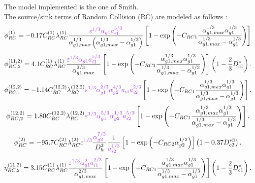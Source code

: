 The model implemented is the one of Smith.\\
The source/sink terms of Random Collision (RC) are modeled as follows :
\begin{equation}
 \phi_{RC}^{(1)} = -0.17 C_{RC}^{(1)} \lambda_{RC}^{(1)} \frac{{\color{mydarkorchid} \varepsilon^{1/3} \alpha_{g1} a_{i1}^{5/3} }}{ \alpha_{g1,max}^{1/3} \left( \alpha_{g1,max}^{1/3} - \alpha_{g1}^{1/3} \right) } \left[ 1 - \exp \left( - C_{RC1} \frac{ \alpha_{g1,max}^{1/3} \alpha_{g1}^{1/3} }{ \alpha_{g1,max}^{1/3} - \alpha_{g1}^{1/3}}\right) \right]
\end{equation}
\begin{equation}
 \phi_{RC,2}^{(11,2)} = 4.1 C_{RC}^{(1)} \lambda_{RC}^{(1)} \frac{{\color{mydarkorchid} \varepsilon^{1/3} \alpha_{g1} a_{i1}^{5/3}} }{ \alpha_{g1,max}^{2/3} } \left[ 1 - \exp \left( - C_{RC1} \frac{ \alpha_{g1,max}^{1/3} \alpha_{g1}^{1/3} }{ \alpha_{g1,max}^{1/3} - \alpha_{g1}^{1/3}}\right) \right]  \left( 1 - \frac{2}{3} D_{c1}^{*} \right).
 \end{equation}
\begin{equation}
  \phi_{RC,1}^{(12,2)} = -1.14 C_{RC}^{(12,2)} \lambda_{RC}^{(12,2)} {\color{mydarkorchid}\varepsilon^{1/3} \alpha_{g1}^{2/3} \alpha_{g2}^{4/3} a_{i1} a_{i2}^{2/3} }\left[ 1 - \exp \left( - C_{RC1} \frac{ \alpha_{g1,max}^{1/3} \alpha_{g1}^{1/3} }{ \alpha_{g1,max}^{1/3} - \alpha_{g1}^{1/3}}\right) \right].
\end{equation}
\begin{equation}
\phi_{RC,2}^{(12,2)} = 1.80 C_{RC}^{(12,2)} \lambda_{RC}^{(12,2)}{\color{mydarkorchid}\varepsilon^{1/3} \alpha_{g1}^{5/3} \alpha_{g2}^{1/3} a_{i2}^{5/3} }\left[ 1 - \exp \left( - C_{RC1} \frac{ \alpha_{g1,max}^{1/3} \alpha_{g1}^{1/3} }{ \alpha_{g1,max}^{1/3} - \alpha_{g1}^{1/3}}\right) \right].
\end{equation}
\begin{equation}
\phi_{RC}^{(2)} = -95.7 C_{RC}^{(2)} \lambda_{RC}^{(2)} {\color{mydarkorchid} \varepsilon^{1/3}} \frac{ {\color{mydarkorchid}\alpha_{g2}^{7/3}} }{ D_h^2 } \frac{1}{{\color{mydarkorchid}a_{i2}^{1/3}}} \left[ 1 - \exp \left( -C_{RC2} \alpha_{g2}^{1/2} \right) \right] \left( 1-0.37 D_{c2}^{*3} \right).
\end{equation}
\begin{equation}
 \eta_{RC,2}^{(11,2)} = 3.15 C_{RC}^{(1)} \lambda_{RC}^{(1)} \frac{ {\color{mydarkorchid}\varepsilon^{1/3} \alpha_{g1}^2 a_{i1}^{2/3}} }{ \alpha_{g1,max}^{2/3} } \left[ 1 - \exp \left( - C_{RC1} \frac{ \alpha_{g1,max}^{1/3} \alpha_{g1}^{1/3} }{ \alpha_{g1,max}^{1/3} - \alpha_{g1}^{1/3}}\right) \right]  \left( 1 - \frac{2}{3} D_{c1}^{*} \right).
\end{equation}
